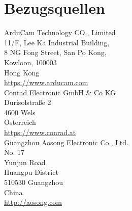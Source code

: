 

\section{Bezugsquellen} \label{app:suppliers}

ArduCam Technology CO., Limited \\
11/F, Lee Ka Industrial Building, \\
8 NG Fong Street, San Po Kong, \\
Kowloon, 100003 \\
Hong Kong \\
\url{https://www.arducam.com} \\

Conrad Electronic GmbH \& Co KG \\
Durisolstraße 2 \\
4600 Wels \\
Österreich \\
\url{https://www.conrad.at} \\

Guangzhou Aosong Electronic Co., Ltd. \\
No. 17 \\
Yunjun Road \\
Huangpu District \\
510530 Guangzhou \\
China \\
\url{http://aosong.com} \\
